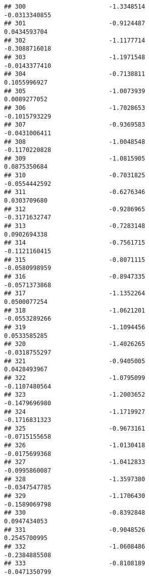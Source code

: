 \documentclass[
]{article}
\begin{document}
\begin{verbatim}
## 300                       -1.3348514                         -0.0313340855
## 301                       -0.9124487                          0.0434593704
## 302                       -1.1177714                         -0.3088716018
## 303                       -1.1971548                         -0.0143377410
## 304                       -0.7138811                          0.1055996927
## 305                       -1.0073939                          0.0089277052
## 306                       -1.7028653                         -0.1015793229
## 307                       -0.9369583                         -0.0431006411
## 308                       -1.0048548                         -0.1170220828
## 309                       -1.0815905                          0.0875350684
## 310                       -0.7031825                         -0.0554442592
## 311                       -0.6276346                          0.0303709680
## 312                       -0.9286965                         -0.3171632747
## 313                       -0.7283148                          0.0902694338
## 314                       -0.7561715                         -0.1121160415
## 315                       -0.8071115                         -0.0580998959
## 316                       -0.8947335                         -0.0571373868
## 317                       -1.1352264                          0.0500077254
## 318                       -1.0621201                         -0.0553289266
## 319                       -1.1094456                          0.0533585285
## 320                       -1.4026265                         -0.0318755297
## 321                       -0.9405005                          0.0428493967
## 322                       -1.0795099                         -0.1107480564
## 323                       -1.2003652                         -0.1479696980
## 324                       -1.1719927                         -0.1716831323
## 325                       -0.9673161                         -0.0715155658
## 326                       -1.0130418                         -0.0175699368
## 327                       -1.0412833                         -0.0995860087
## 328                       -1.3597380                         -0.0347547785
## 329                       -1.1706430                         -0.1589069798
## 330                       -0.8392848                          0.0947434053
## 331                       -0.9048526                          0.2545700995
## 332                       -1.0608486                         -0.2384885508
## 333                       -0.8108189                         -0.0471350799

\end{verbatim}
\end{document}
